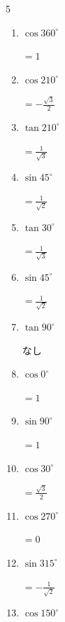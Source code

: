 \begin{multicols}{5}
\begin{enumerate}
        $\displaystyle =-1$

  \item $\displaystyle \cos{360^\circ}$

        $\displaystyle =1$

  \item $\displaystyle \cos{210^\circ}$

        $\displaystyle =-\frac{\sqrt{3}}{2}$

  \item $\displaystyle \tan{210^\circ}$

        $\displaystyle =\frac{1}{\sqrt{3}}$

  \item $\displaystyle \sin{45^\circ}$

        $\displaystyle =\frac{1}{\sqrt{2}}$

  \item $\displaystyle \tan{30^\circ}$

        $\displaystyle =\frac{1}{\sqrt{3}}$

  \item $\displaystyle \sin{45^\circ}$

        $\displaystyle =\frac{1}{\sqrt{2}}$

  \item $\displaystyle \tan{90^\circ}$

        $\displaystyle なし$

  \item $\displaystyle \cos{0^\circ}$

        $\displaystyle =1$

  \item $\displaystyle \sin{90^\circ}$

        $\displaystyle =1$

  \item $\displaystyle \cos{30^\circ}$

        $\displaystyle =\frac{\sqrt{3}}{2}$

  \item $\displaystyle \cos{270^\circ}$

        $\displaystyle =0$

  \item $\displaystyle \sin{315^\circ}$

        $\displaystyle =-\frac{1}{\sqrt{2}}$

\columnbreak %

  \item $\displaystyle \cos{150^\circ}$


\end{enumerate}
\end{multicols}
